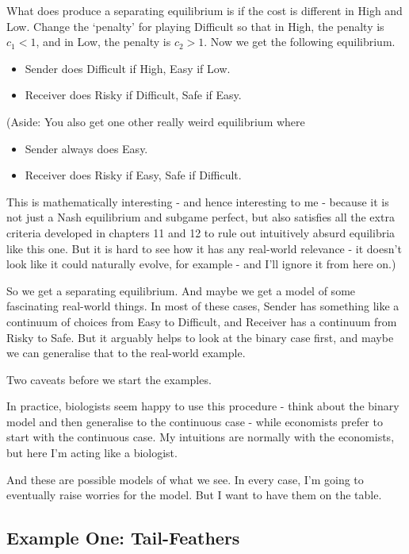 \documentclass[
  11pt,
]{article}
\providecommand{\tightlist}{%
  \setlength{\itemsep}{0pt}\setlength{\parskip}{0pt}}
\begin{document}
What does produce a separating equilibrium is if the cost is different
in High and Low. Change the `penalty' for playing Difficult so that in
High, the penalty is \(c_1 < 1\), and in Low, the penalty is
\(c_2 > 1\). Now we get the following equilibrium.

\begin{itemize}
\tightlist
\item
  Sender does Difficult if High, Easy if Low.
\item
  Receiver does Risky if Difficult, Safe if Easy.
\end{itemize}

(Aside: You also get one other really weird equilibrium where

\begin{itemize}
\tightlist
\item
  Sender always does Easy.
\item
  Receiver does Risky if Easy, Safe if Difficult.
\end{itemize}

This is mathematically interesting - and hence interesting to me -
because it is not just a Nash equilibrium and subgame perfect, but also
satisfies all the extra criteria developed in chapters 11 and 12 to rule
out intuitively absurd equilibria like this one. But it is hard to see
how it has any real-world relevance - it doesn't look like it could
naturally evolve, for example - and I'll ignore it from here on.)

So we get a separating equilibrium. And maybe we get a model of some
fascinating real-world things. In most of these cases, Sender has
something like a continuum of choices from Easy to Difficult, and
Receiver has a continuum from Risky to Safe. But it arguably helps to
look at the binary case first, and maybe we can generalise that to the
real-world example.

Two caveats before we start the examples.

In practice, biologists seem happy to use this procedure - think about
the binary model and then generalise to the continuous case - while
economists prefer to start with the continuous case. My intuitions are
normally with the economists, but here I'm acting like a biologist.

And these are possible models of what we see. In every case, I'm going
to eventually raise worries for the model. But I want to have them on
the table.

\hypertarget{example-one-tail-feathers}{%
\subsection{Example One:
Tail-Feathers}\label{example-one-tail-feathers}}
\end{document}

